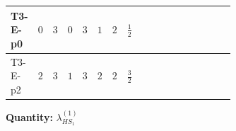 \documentclass[8pt]{article}
\begin{document}
\begin{landscape}
\begin{longtable}{@{}llcccccc >{\raggedright\arraybackslash}p{0.21\linewidth} >{\raggedright\arraybackslash}p{0.21\linewidth} >{\raggedright\arraybackslash}p{0.21\linewidth}@{}}
\midrule
T3-E-p0 & $0$ & $3$ & $0$ & $3$ & $1$ & $2$ & $\frac{1}{2}$ & \scriptsize\adjustbox{max width=\linewidth}{$\begin{gathered} {\lambda_{HS_1}^{(1)}} (2 T_{\nu}^{(1)}+6 \operatorname{Tr}\!\left({Y_d}\,\left({Y_d}\right)^{\dagger}\right)+2 \operatorname{Tr}\!\left({Y_e}\,\left({Y_e}\right)^{\dagger}\right)+6 \operatorname{Tr}\!\left({Y_u}\,\left({Y_u}\right)^{\dagger}\right)+4 {\lambda_{S_1}^{(A)}})\end{gathered}$} & \scriptsize\adjustbox{max width=\linewidth}{$\begin{gathered} +6 {g_2}^4\end{gathered}$} & \scriptsize\adjustbox{max width=\linewidth}{$\begin{gathered} +6 {\lambda_{HS_1}^{(A)}}^2\end{gathered}$} \\
\midrule
T3-E-p2 & $2$ & $3$ & $1$ & $3$ & $2$ & $2$ & $\frac{3}{2}$ & \scriptsize\adjustbox{max width=\linewidth}{$\begin{gathered} {\lambda_{HS_1}^{(1)}} (2 T_{\nu}^{(1)}+6 \operatorname{Tr}\!\left({Y_d}\,\left({Y_d}\right)^{\dagger}\right)+2 \operatorname{Tr}\!\left({Y_e}\,\left({Y_e}\right)^{\dagger}\right)+6 \operatorname{Tr}\!\left({Y_u}\,\left({Y_u}\right)^{\dagger}\right)+4 {\lambda_{S_1}^{(A)}})\end{gathered}$} & \scriptsize\adjustbox{max width=\linewidth}{$\begin{gathered} +6 {g_2}^4\end{gathered}$} & \scriptsize\adjustbox{max width=\linewidth}{$\begin{gathered} +6 {\lambda_{HS_1}^{(A)}}^2\end{gathered}$} \\
\midrule
\bottomrule
\end{longtable}
\clearpage
\noindent\textbf{Quantity: }$\lambda_{HS_1}^{(1)}$\par\smallskip

\end{landscape}
\end{document}
